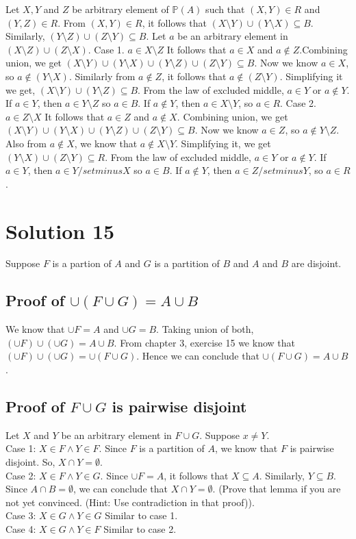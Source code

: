 \documentclass{article}
\begin{document}
Let $X,Y$ and $Z$ be arbitrary element of $\mathbb{P}(A)$ such that
$(X,Y) \in R$ and $(Y,Z) \in R$. From $(X,Y) \in R$, it follows that
$(X \setminus Y) \cup (Y \setminus X) \subseteq B$. Similarly, $(Y
\setminus Z) \cup (Z \setminus Y) \subseteq B$. Let $a$ be an
arbitrary element in $(X \setminus Z) \cup (Z \setminus X)$.
Case 1. $a \in X \setminus Z$
It follows that $a \in X$ and $a \notin Z$.Combining union, we get $(X
\setminus Y) \cup (Y \setminus X) \cup (Y \setminus Z) \cup (Z
\setminus Y) \subseteq B$. Now we know $a \in X$, so $a \notin (Y
\setminus X)$. Similarly from $a \notin Z$, it follows that $a \notin
(Z \setminus Y)$. Simplifying it we get, $(X \setminus Y) \cup (Y
\setminus Z) \subseteq B$. From the law of excluded middle, $a \in Y$
or $a \notin Y$. If $a \in Y$, then $a \in Y \setminus Z$ so $a \in
B$. If $a \notin Y$, then $a \in X \setminus Y$, so $a \in R$.
Case 2. $a \in Z \setminus X$
It follows that $a \in Z$ and $a \notin X$. Combining union, we get $(X
\setminus Y) \cup (Y \setminus X) \cup (Y \setminus Z) \cup (Z
\setminus Y) \subseteq B$. Now we know $a \in Z$, so $a \notin Y
\setminus Z$. Also from $a \notin X$, we know that $a \notin X
\setminus Y$. Simplifying it, we get $(Y \setminus X) \cup (Z
\setminus Y) \subseteq R$. From the law of excluded middle, $a \in Y$
or $a \notin Y$. If $a \in Y$, then $a \in Y /setminus X$ so $a \in
B$. If $a \notin Y$, then $a \in Z / setminus Y$, so $a \in R$.

\section{Solution 15}
Suppose $F$ is a partion of $A$ and $G$ is a partition of $B$ and $A$
and $B$ are disjoint.
\subsection{Proof of $\cup(F \cup G) = A \cup B$}
We know that $\cup F = A$ and $\cup G = B$. Taking union of both,
$(\cup F) \cup (\cup G) = A \cup B$. From chapter 3, exercise 15 we
know that $(\cup F) \cup (\cup G) = \cup(F \cup G)$. Hence we can
conclude that $\cup(F \cup G) = A \cup B$.

\subsection{Proof of $F \cup G$ is pairwise disjoint}
Let $X$ and $Y$ be an arbitrary element in $F \cup G$. Suppose $x \neq
Y$.
\\ Case 1: $X \in F \land Y \in F$. Since $F$ is a partition of $A$, we
know that $F$ is pairwise disjoint. So, $X \cap Y = \emptyset$.
\\ Case 2: $X \in F \land Y \in G$. Since $\cup F = A$, it follows that
$X \subseteq A$. Similarly, $Y \subseteq B$. Since $A \cap B =
\emptyset$, we can conclude that $X \cap Y = \emptyset$. (Prove that
lemma if you are not yet convinced. (Hint: Use contradiction in that proof)).
\\ Case 3: $X \in G \land Y \in G$ Similar to case 1.
\\ Case 4: $X \in G \land Y \in F$ Similar to case 2.
\end{document}
